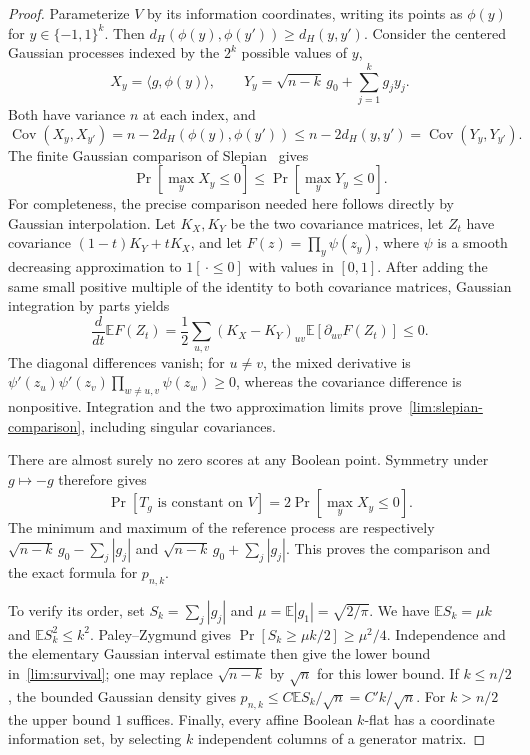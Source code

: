 \documentclass[11pt,letterpaper]{article}
\theoremstyle{definition}
\theoremstyle{remark}
\begin{document}
\begin{proof}
Parameterize $V$ by its information coordinates, writing its points as
$\phi(y)$ for $y\in\{-1,1\}^k$.  Then
$d_H(\phi(y),\phi(y'))\ge d_H(y,y')$.  Consider the centered Gaussian
processes indexed by the $2^k$ possible values of $y$,
\[
 X_y=\langle g,\phi(y)\rangle,
 \qquad Y_y=\sqrt{n-k}\,g_0+\sum_{j=1}^k g_jy_j.
\]
Both have variance $n$ at each index, and
\[
 \operatorname{Cov}(X_y,X_{y'})
 =n-2d_H(\phi(y),\phi(y'))
 \le n-2d_H(y,y')
 =\operatorname{Cov}(Y_y,Y_{y'}).
\]
The finite Gaussian comparison of Slepian~\cite{Slepian} gives
\begin{equation}
 \Pr[\max_y X_y\le0]\le\Pr[\max_yY_y\le0].
 \label{lim:slepian-comparison}
\end{equation}
For completeness, the precise comparison needed here follows directly by
Gaussian interpolation.  Let $K_X,K_Y$ be the two covariance matrices,
let $Z_t$ have covariance $(1-t)K_Y+tK_X$, and let
$F(z)=\prod_y\psi(z_y)$, where $\psi$ is a smooth decreasing approximation
to $1[\,\cdot\le0]$ with values in $[0,1]$.  After adding the same small
positive multiple of the identity to both covariance matrices, Gaussian
integration by parts yields
\[
 \frac{d}{dt}\mathbb E F(Z_t)
 =\frac12\sum_{u,v}(K_X-K_Y)_{uv}
                        \mathbb E[\partial_{uv}F(Z_t)]\le0.
\]
The diagonal differences vanish; for $u\ne v$, the mixed derivative is
$\psi'(z_u)\psi'(z_v)\prod_{w\ne u,v}\psi(z_w)\ge0$, whereas the covariance
difference is nonpositive.  Integration and the two approximation limits
prove~\eqref{lim:slepian-comparison}, including singular covariances.

There are almost surely no zero scores at any Boolean point.  Symmetry
under $g\mapsto-g$ therefore gives
\[
 \Pr[T_g\text{ is constant on }V]=2\Pr[\max_yX_y\le0].
\]
The minimum and maximum of the reference process are respectively
$\sqrt{n-k}\,g_0-\sum_j|g_j|$ and
$\sqrt{n-k}\,g_0+\sum_j|g_j|$.  This proves the comparison and the exact
formula for $p_{n,k}$.

To verify its order, set $S_k=\sum_j|g_j|$ and
$\mu=\mathbb E|g_1|=\sqrt{2/\pi}$.  We have
$\mathbb E S_k=\mu k$ and $\mathbb E S_k^2\le k^2$.
Paley--Zygmund gives
$\Pr[S_k\ge\mu k/2]\ge\mu^2/4$.  Independence and the elementary Gaussian
interval estimate then give the lower bound in~\eqref{lim:survival}; one may
replace $\sqrt{n-k}$ by $\sqrt n$ for this lower bound.  If $k\le n/2$,
the bounded Gaussian density gives
$p_{n,k}\le C\mathbb E S_k/\sqrt n=C'k/\sqrt n$.
For $k>n/2$ the upper bound $1$ suffices.  Finally, every affine Boolean
$k$-flat has a coordinate information set, by selecting $k$ independent
columns of a generator matrix.
\end{proof}
\end{document}

